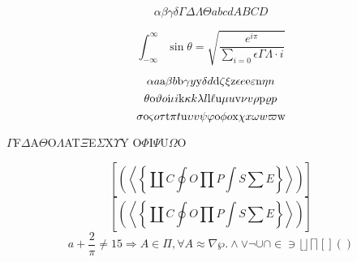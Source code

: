 \documentclass[12pt]{article}
\begin{document}
\[
\alpha\beta\gamma\delta \Gamma\Delta\Lambda\Theta abcd ABCD
\]

\[
\int_{-\infty}^{\infty}\sin\theta =
\sqrt{\frac{e^{i\pi}}{\sum_{i=0}{\epsilon}\Gamma\Lambda\cdot i}}
\]

\[
\alpha a \hbox{a} \beta b \hbox{b} \gamma y \hbox{y} \delta d \hbox{d} \zeta \xi
\hbox{z} \epsilon e \hbox{e} \varepsilon \hbox{n} \eta n
\]
\[
\theta \hbox{o} \vartheta o \hbox{i} \iota i \hbox{k} \kappa k \lambda l
\hbox{l} \ell \hbox{u} \mu u \hbox{v} \nu v \rho \hbox{p} \varrho p
\]
\[
\sigma \hbox{o} \varsigma o \tau \hbox{t} \pi t \hbox{u} \upsilon v \psi \varphi
\hbox{o} \phi o \hbox{x} \chi x \omega w \varpi \hbox{w}
\]
\begin{center}
$\Gamma$F$\Delta$A$\Theta$O$\Lambda$AT$\Xi$E$\Sigma$X$\Upsilon$Y
O$\Phi$I$\Psi$U$\Omega$O
\end{center}
\[
\textstyle
\left[\left(\left\langle\left\{
\coprod C \oint O \prod P \int S\sum E
\right\}\right\rangle\right)\right]
\]
\[
\left[\left(\left\langle\left\{
\coprod C \oint O \prod P \int S\sum E
\right\}\right\rangle\right)\right]
\]
\[
a + \frac{2}{\pi} \ne 15 \Longrightarrow A \in \Pi, \forall A \approx \nabla\wp.
\wedge \vee \neg \cup \cap \in \ni \lfloor \rfloor \lceil \rceil [ ] ( )
\]
\end{document}
